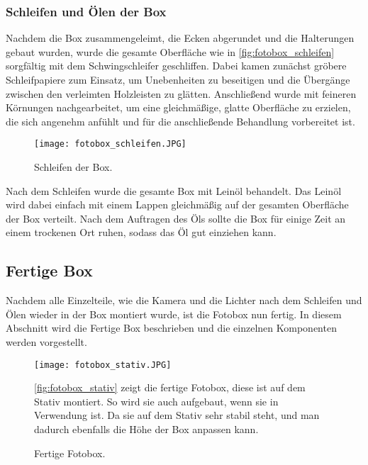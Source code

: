 \subsubsection{Schleifen und Ölen der Box}

Nachdem die Box zusammengeleimt, die Ecken abgerundet und die Halterungen
gebaut wurden, wurde die gesamte Oberfläche wie in \autoref{fig:fotobox_schleifen}
sorgfältig mit dem Schwingschleifer  geschliffen.
Dabei kamen zunächst gröbere Schleifpapiere zum Einsatz, um Unebenheiten zu
beseitigen und die Übergänge zwischen den verleimten Holzleisten zu glätten.
Anschließend wurde mit feineren Körnungen nachgearbeitet, um eine gleichmäßige,
glatte Oberfläche zu erzielen, die sich angenehm anfühlt und für die
anschließende Behandlung vorbereitet ist.

\begin{figure}[H]
    \centering
    \texttt{[image: fotobox\_schleifen.JPG]}
    \caption{Schleifen der Box.}
    \label{fig:fotobox_schleifen}
\end{figure}

Nach dem Schleifen wurde die gesamte Box mit Leinöl behandelt.
Das Leinöl wird dabei einfach mit einem Lappen gleichmäßig auf der gesamten 
Oberfläche der Box verteilt. Nach dem Auftragen des Öls sollte die Box
für einige Zeit an einem trockenen Ort ruhen, sodass das Öl gut einziehen kann.

\newpage

\subsection{Fertige Box}

Nachdem alle Einzelteile, wie die Kamera und die Lichter nach dem Schleifen
und Ölen wieder in der Box montiert wurde, ist die Fotobox nun fertig. In diesem
Abschnitt wird die Fertige Box beschrieben und die einzelnen Komponenten
werden vorgestellt.


\begin{figure}[H]
    \centering
    \begin{minipage}{0.57\textwidth}
        \texttt{[image: fotobox\_stativ.JPG]}
        \caption{Fertige Fotobox.}
        \label{fig:fotobox_stativ}
    \end{minipage}
    \hfill
    \begin{minipage}{0.4\textwidth}
        \small
        \autoref{fig:fotobox_stativ} zeigt die fertige Fotobox, diese ist 
        auf dem Stativ montiert. So wird sie auch aufgebaut, wenn sie in
        Verwendung ist. Da sie auf dem Stativ sehr stabil steht, und man
        dadurch ebenfalls die Höhe der Box anpassen kann.
    \end{minipage}
\end{figure}

